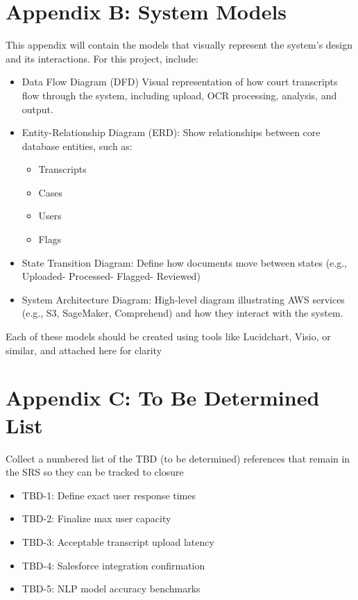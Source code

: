 \documentclass[12pt]{article}
\begin{document}
\section{Appendix B: System Models}
 This appendix will contain the models that visually represent the system's design and its
 interactions. For this project, include:
\begin{itemize}
  \item Data Flow Diagram (DFD)  Visual representation of how court transcripts flow through the
 system, including upload, OCR processing, analysis, and output.
  \item Entity-Relationship Diagram (ERD): Show relationships between core database entities,
 such as: 
	\begin{itemize}
		\item Transcripts
		\item Cases
		\item Users
		\item Flags
	\end{itemize}
  \item State Transition Diagram: Define how documents move between states (e.g., Uploaded-
 Processed- Flagged- Reviewed)
  \item System Architecture Diagram: High-level diagram illustrating AWS services (e.g., S3,
 SageMaker, Comprehend) and how they interact with the system.
\end{itemize}
 Each of these models should be created using tools like Lucidchart, Visio, or similar, and
 attached here for clarity

\section{Appendix C: To Be Determined List}
 Collect a numbered list of the TBD (to be determined) references that remain in the SRS so they
 can be tracked to closure
\begin{itemize}
  \item TBD-1: Define exact user response times
  \item TBD-2: Finalize max user capacity
  \item TBD-3: Acceptable transcript upload latency
  \item TBD-4: Salesforce integration confirmation
  \item TBD-5: NLP model accuracy benchmarks
\end{itemize}
\end{document}
